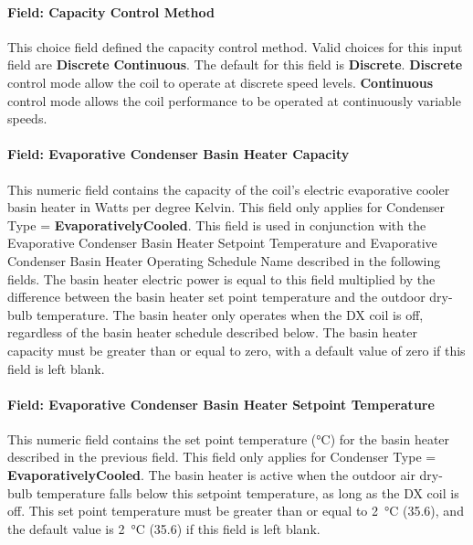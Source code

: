 \paragraph{Field: Capacity Control Method}

This choice field defined the capacity control method. Valid choices for this input field are \textbf{Discrete} \textbf{Continuous}. The default for this field is \textbf{Discrete}. \textbf{Discrete} control mode allow the coil to operate at discrete speed levels. \textbf{Continuous} control mode allows the coil performance to be operated at continuously variable speeds.

\paragraph{Field: Evaporative Condenser Basin Heater Capacity}\label{field-evaporative-condenser-basin-heater-capacity-000}

This numeric field contains the capacity of the coil's electric evaporative cooler basin heater in Watts per degree Kelvin. This field only applies for Condenser Type = \textbf{EvaporativelyCooled}. This field is used in conjunction with the Evaporative Condenser Basin Heater Setpoint Temperature and Evaporative Condenser Basin Heater Operating Schedule Name described in the following fields. The basin heater electric power is equal to this field multiplied by the difference between the basin heater set point temperature and the outdoor dry-bulb temperature. The basin heater only operates when the DX coil is off, regardless of the basin heater schedule described below. The basin heater capacity must be greater than or equal to zero, with a default value of zero if this field is left blank.

\paragraph{Field: Evaporative Condenser Basin Heater Setpoint Temperature}\label{field-evaporative-condenser-basin-heater-setpoint-temperature-000}

This numeric field contains the set point temperature (\si{\celsius}) for the basin heater described in the previous field. This field only applies for Condenser Type = \textbf{EvaporativelyCooled}. The basin heater is active when the outdoor air dry-bulb temperature falls below this setpoint temperature, as long as the DX coil is off. This set point temperature must be greater than or equal to \SI{2}{\celsius} (\SI{35.6}{\fahrenheit}), and the default value is \SI{2}{\celsius} (\SI{35.6}{\fahrenheit}) if this field is left blank.

